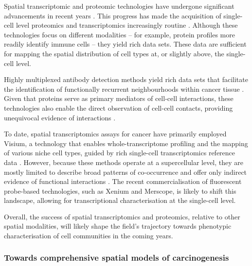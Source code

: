 Spatial transcriptomic and proteomic technologies have undergone significant advancements in recent years \parencite{Lewis2021-ic, Mund2022-kf}. This progress has made the acquisition of single-cell level proteomics and transcriptomics increasingly routine . Although these technologies focus on different modalities -- for example, protein profiles more readily identify immune cells -- they yield rich data sets. These data are sufficient for mapping the spatial distribution of cell types at, or slightly above, the single-cell level.

Highly multiplexed antibody detection methods yield rich data sets that facilitate the identification of functionally recurrent neighbourhoods within cancer tissue \parencite{Danenberg2022-zb, Jackson2020-em, Nirmal2022-sq, Schurch2020-lp, Wang2023-bo}. Given that proteins serve as primary mediators of cell-cell interactions, these technologies also enable the direct observation of cell-cell contacts, providing unequivocal evidence of interactions \parencite{Nirmal2022-sq, Wang2023-bo}.

To date, spatial transcriptomics assays for cancer have primarily employed \ac{Visium}, a technology that enables whole-transcriptome profiling and the mapping of various niche cell types, guided by rich single-cell transcriptomics reference data \parencite{Andersson2021-pu, Stahl2016-nq, Wu2021-uq, Berglund2018-gh, Moncada2020-ck, Qi2022-by, Ji2020-gn, Ravi2022-ut, Wu2021-wb, Gouin2021-zx, Barkley2022-gx, Erickson2022-zh}. However, because these methods operate at a supercellular level, they are mostly limited to describe broad patterns of co-occurrence and offer only indirect evidence of functional interactions . The recent commercialisation of fluorescent probe-based technologies, such as \ac{Xenium} and \ac{Merscope}, is likely to shift this landscape, allowing for transcriptional characterisation at the single-cell level.

Overall, the success of spatial transcriptomics and proteomics, relative to other spatial modalities, will likely shape the field's trajectory towards phenotypic characterisation of cell communities in the coming years.

\subsubsection*{Towards comprehensive spatial models of carcinogenesis}


